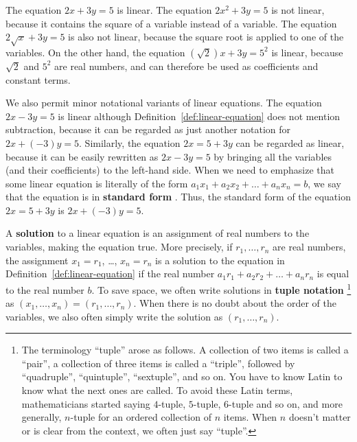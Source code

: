 \begin{solution}
  The equation $2x+3y=5$ is linear. The equation $2x^2+3y=5$ is not
  linear, because it contains the square of a variable instead of a
  variable.  The equation $2\sqrt{x} + 3y = 5$ is also not linear,
  because the square root is applied to one of the variables. On the
  other hand, the equation $(\sqrt{2}) x + 3y = 5^2$ is linear,
  because $\sqrt{2}$ and $5^2$ are real numbers, and can
  therefore be used as coefficients and constant terms.
\end{solution}

We also permit minor notational variants of linear equations. The
equation $2x-3y=5$ is linear although
Definition~\ref{def:linear-equation} does not mention subtraction,
because it can be regarded as just another notation for
$2x+(-3)y = 5$. Similarly, the equation $2x=5+3y$ can be regarded as
linear, because it can be easily rewritten as $2x-3y=5$ by bringing
all the variables (and their coefficients) to the left-hand side.
When we need to emphasize that some linear equation is literally of
the form $a_1x_1 + a_2x_2 + \ldots + a_nx_n = b$, we say that the
equation is in \textbf{standard form}%
%
. Thus, the standard form of
the equation $2x=5+3y$ is $2x+(-3)y=5$.

A \textbf{solution}%
 to a linear equation is an assignment
of real numbers to the variables, making the equation true. More
precisely, if $r_1,\ldots,r_n$ are real numbers, the assignment
$x_1=r_1$, \ldots, $x_n=r_n$ is a solution to the equation in
Definition~\ref{def:linear-equation} if the real number
$a_1r_1 + a_2r_2 + \ldots + a_nr_n$ is equal to the real number
$b$. To save space, we often write solutions in \textbf{tuple
  notation}%
\footnote{The terminology ``tuple'' arose as follows. A
  collection of two items is called a ``pair'', a collection of three
  items is called a ``triple'', followed by ``quadruple'',
  ``quintuple'', ``sextuple'', and so on. You have to know Latin to
  know what the next ones are called. To avoid these Latin terms,
  mathematicians started saying $4$-tuple, $5$-tuple, $6$-tuple and so
  on, and more generally, $n$-tuple for an ordered collection of $n$
  items. When $n$ doesn't matter or is clear from the context, we
  often just say ``tuple''.}  as
$(x_1,\ldots,x_n) = (r_1,\ldots,r_n)$. When there is no doubt about
the order of the variables, we also often simply write the solution as
$(r_1,\ldots,r_n)$.

